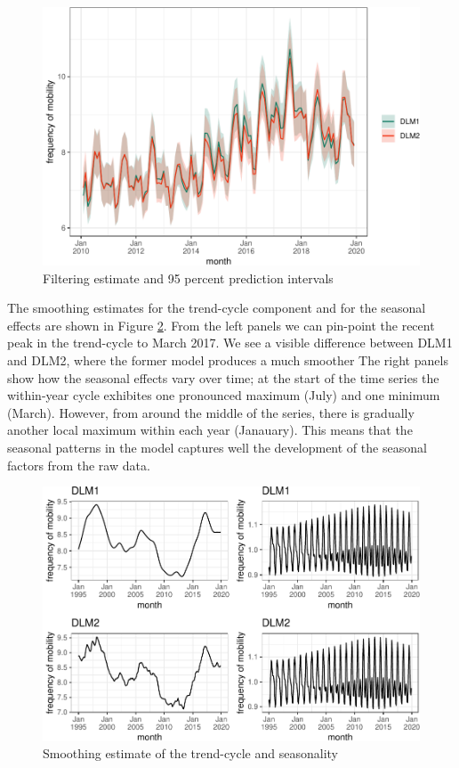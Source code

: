 \documentclass[]{article}
\begin{document}
\begin{figure}
\centering
\includegraphics{../figs/freq--ci-comparison-1.pdf}
\caption{\label{fig:ci-comparison}Filtering estimate and 95 percent
prediction intervals}
\end{figure}

The smoothing estimates for the trend-cycle component and for the
seasonal effects are shown in Figure \ref{fig:dlm-smoothed}. From the
left panels we can pin-point the recent peak in the trend-cycle to March
2017. We see a visible difference between DLM1 and DLM2, where the
former model produces a much smoother The right panels show how the
seasonal effects vary over time; at the start of the time series the
within-year cycle exhibites one pronounced maximum (July) and one
minimum (March). However, from around the middle of the series, there is
gradually another local maximum within each year (Janauary). This means
that the seasonal patterns in the model captures well the development of
the seasonal factors from the raw data.

\begin{figure}
\centering
\includegraphics{../figs/freq--dlm-smoothed-1.pdf}
\caption{\label{fig:dlm-smoothed}Smoothing estimate of the trend-cycle and
seasonality}
\end{figure}
\end{document}
